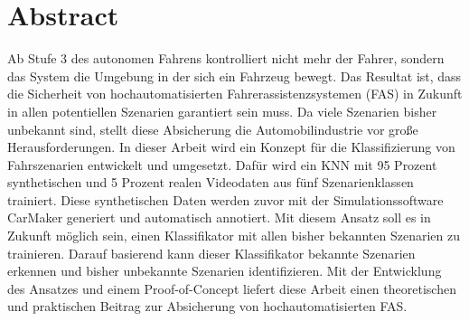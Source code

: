 

\chapter*{Abstract}

Ab Stufe 3 des autonomen Fahrens kontrolliert nicht mehr der Fahrer, sondern das System die Umgebung in der sich ein Fahrzeug bewegt. Das Resultat ist, dass die Sicherheit von hochautomatisierten Fahrerassistenzsystemen (\acs{FAS}) in Zukunft in allen potentiellen Szenarien garantiert sein muss. Da viele Szenarien bisher unbekannt sind, stellt diese Absicherung die Automobilindustrie vor große Herausforderungen. In dieser Arbeit wird ein Konzept für die Klassifizierung von Fahrszenarien entwickelt und umgesetzt. Dafür wird ein \ac{KNN} mit 95 Prozent synthetischen und 5 Prozent realen Videodaten aus fünf Szenarienklassen trainiert. Diese synthetischen Daten werden zuvor mit der Simulationssoftware CarMaker generiert und automatisch annotiert. Mit diesem Ansatz soll es in Zukunft möglich sein, einen Klassifikator mit allen bisher bekannten Szenarien zu trainieren. Darauf basierend kann dieser Klassifikator bekannte Szenarien erkennen und bisher unbekannte Szenarien identifizieren. Mit der Entwicklung des Ansatzes und einem Proof-of-Concept liefert diese Arbeit einen theoretischen und praktischen Beitrag zur Absicherung von hochautomatisierten \acs{FAS}.

